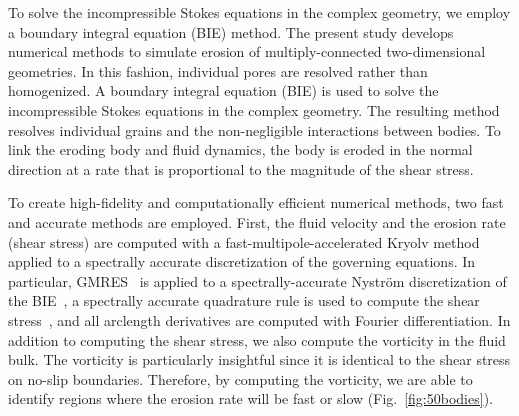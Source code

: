 \documentclass[preprint, 10pt]{elsarticle}
\begin{document}


To solve the incompressible Stokes equations in the complex geometry, we
employ a boundary integral equation (BIE) method.
The present study develops numerical methods to simulate erosion of multiply-connected two-dimensional geometries. In this fashion, individual pores are resolved rather than homogenized.  A boundary integral equation (BIE) is used to solve the incompressible Stokes equations in the complex geometry.  The resulting method resolves individual grains and the non-negligible interactions between bodies.  To link the eroding body and fluid dynamics, the body is eroded in the normal direction at a rate that is proportional to the magnitude of the shear stress.


To create high-fidelity and computationally efficient numerical methods,
two fast and accurate methods are employed.  First, the fluid velocity
and the erosion rate (shear stress) are computed with a
fast-multipole-accelerated Kryolv method applied to a spectrally
accurate discretization of the governing equations.  In particular,
GMRES~\cite{saa-sch1986} is applied to a spectrally-accurate Nystr\"om
discretization of the BIE~\cite{tre-wei2014}, a spectrally accurate
quadrature rule is used to compute the shear stress~\cite{sid-isr1988},
and all arclength derivatives are computed with Fourier differentiation.
In addition to computing the shear stress, we also compute the vorticity
in the fluid bulk.  The vorticity is particularly insightful since it is
identical to the shear stress on no-slip boundaries.  Therefore, by
computing the vorticity, we are able to identify regions where the
erosion rate will be fast or slow (Fig.~\ref{fig:50bodies}).
\end{document}
